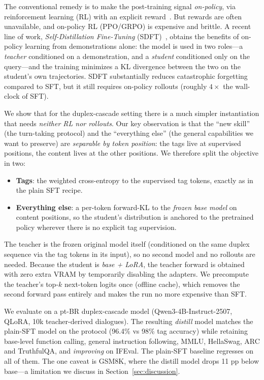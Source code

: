 \documentclass[conference]{IEEEtran}
\begin{document}
The conventional remedy is to make the post-training signal \emph{on-policy}, via
reinforcement learning (RL) with an explicit reward~\cite{chu2025,airef}. But rewards
are often unavailable, and on-policy RL (PPO/GRPO) is expensive and brittle. A recent
line of work, \emph{Self-Distillation Fine-Tuning}
(SDFT)~\cite{selfdistill2026}, obtains the benefits of on-policy learning from
demonstrations alone: the model is used in two roles---a \emph{teacher} conditioned
on a demonstration, and a \emph{student} conditioned only on the query---and the
training minimizes a KL divergence between the two on the student's own trajectories.
SDFT substantially reduces catastrophic forgetting compared to SFT, but it still
requires on-policy rollouts (roughly $4\times$ the wall-clock of SFT).

We show that for the duplex-cascade setting there is a much simpler instantiation
that needs \emph{neither RL nor rollouts}. Our key observation is that the
``new skill'' (the turn-taking protocol) and the ``everything else'' (the general
capabilities we want to preserve) are \emph{separable by token position}: the tags
live at supervised positions, the content lives at the other positions. We therefore
split the objective in two:

\begin{itemize}
  \item \textbf{Tags}: the weighted cross-entropy to the supervised tag tokens,
        exactly as in the plain SFT recipe.
  \item \textbf{Everything else}: a per-token forward-KL to the \emph{frozen base
        model} on content positions, so the student's distribution is anchored to
        the pretrained policy wherever there is no explicit tag supervision.
\end{itemize}

The teacher is the frozen original model itself (conditioned on the same duplex
sequence via the tag tokens in its input), so no second model and no rollouts are
needed. Because the student is \emph{base + LoRA}, the teacher forward is obtained
with zero extra VRAM by temporarily disabling the adapters. We precompute the
teacher's top-$k$ next-token logits once (offline cache), which removes the second
forward pass entirely and makes the run no more expensive than SFT.

We evaluate on a pt-BR duplex-cascade model (Qwen3-4B-Instruct-2507, QLoRA, 10k
teacher-derived dialogues). The resulting \emph{distill} model matches the plain-SFT
model on the protocol (96.4\% vs 98\% tag accuracy) while retaining base-level
function calling, general instruction following, MMLU, HellaSwag, ARC and TruthfulQA,
and \emph{improving} on IFEval. The plain-SFT baseline regresses on all of them. The
one caveat is GSM8K, where the distill model drops 11 pp below base---a limitation we
discuss in Section~\ref{sec:discussion}.
\end{document}
